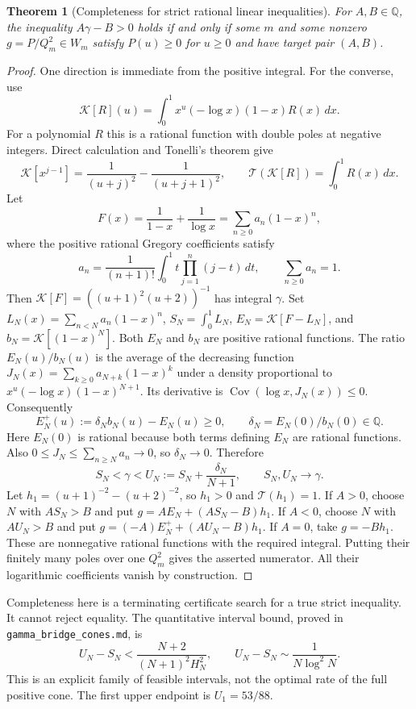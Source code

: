 \documentclass[11pt,a4paper]{article}
\newcommand{\Q}{\mathbb Q}
\newtheorem{theorem}{Theorem}[section]
\theoremstyle{definition}
\theoremstyle{remark}
\numberwithin{equation}{section}
\begin{document}
\begin{theorem}[Completeness for strict rational linear inequalities]
\label{ec:positive-complete}
For $A,B\in\Q$, the inequality $A\gamma-B>0$ holds if and only if some
$m$ and some nonzero $g=P/Q_m^2\in W_m$ satisfy
$P(u)\ge0$ for $u\ge0$ and have target pair $(A,B)$.
\end{theorem}
\begin{proof}
One direction is immediate from the positive integral.  For the converse,
use
\[
 \mathcal K[R](u)=\int_0^1x^u(-\log x)(1-x)R(x)\,dx.
\]
For a polynomial $R$ this is a rational function with double poles at
negative integers.  Direct calculation and Tonelli's theorem give
\[
 \mathcal K[x^{j-1}]=\frac1{(u+j)^2}-\frac1{(u+j+1)^2},
 \qquad \mathcal T(\mathcal K[R])=\int_0^1R(x)\,dx.
\]
Let
\[
 F(x)=\frac1{1-x}+\frac1{\log x}
     =\sum_{n\ge0}a_n(1-x)^n,
\]
where the positive rational Gregory coefficients satisfy
\[
 a_n=\frac1{(n+1)!}\int_0^1t\prod_{j=1}^n(j-t)\,dt,
 \qquad \sum_{n\ge0}a_n=1.
\]
Then $\mathcal K[F]=((u+1)^2(u+2))^{-1}$ has integral $\gamma$.
Set $L_N(x)=\sum_{n<N}a_n(1-x)^n$, $S_N=\int_0^1L_N$,
$E_N=\mathcal K[F-L_N]$, and $b_N=\mathcal K[(1-x)^N]$.
Both $E_N$ and $b_N$ are positive rational functions.  The ratio
$E_N(u)/b_N(u)$ is the average of the decreasing function
$J_N(x)=\sum_{k\ge0}a_{N+k}(1-x)^k$ under a density proportional to
$x^u(-\log x)(1-x)^{N+1}$.  Its derivative is
$\operatorname{Cov}(\log x,J_N(x))\le0$.  Consequently
\[
 E_N^+(u):=\delta_Nb_N(u)-E_N(u)\ge0,
 \qquad \delta_N=E_N(0)/b_N(0)\in\Q.
\]
Here $E_N(0)$ is rational because both terms defining $E_N$ are rational
functions.  Also $0\le J_N\le\sum_{n\ge N}a_n\to0$, so
$\delta_N\to0$.  Therefore
\[
 S_N<\gamma<U_N:=S_N+\frac{\delta_N}{N+1},
 \qquad S_N,U_N\longrightarrow\gamma.
\]
Let $h_1=(u+1)^{-2}-(u+2)^{-2}$, so $h_1>0$ and
$\mathcal T(h_1)=1$.  If $A>0$, choose $N$ with $AS_N>B$ and put
$g=AE_N+(AS_N-B)h_1$.  If $A<0$, choose $N$ with $AU_N>B$ and put
$g=(-A)E_N^++(AU_N-B)h_1$.  If $A=0$, take $g=-Bh_1$.
These are nonnegative rational functions with the required integral.
Putting their finitely many poles over one $Q_m^2$ gives the asserted
numerator.  All their logarithmic coefficients vanish by construction.
\end{proof}

Completeness here is a terminating certificate search for a true strict
inequality.  It cannot reject equality.  The quantitative interval bound,
proved in \texttt{gamma\_bridge\_cones.md}, is
\[
 U_N-S_N<\frac{N+2}{(N+1)^2H_N^2},\qquad
 U_N-S_N\sim\frac1{N\log^2N}.
\]
This is an explicit family of feasible intervals, not the optimal rate of
the full positive cone.  The first upper endpoint is $U_1=53/88$.
\end{document}
